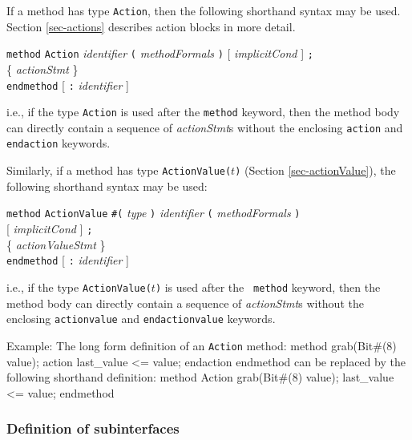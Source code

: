 \documentclass[twoside,letterpaper]{article}
\newcommand{\hm}{\hspace*{1em}}
\newcommand{\hmm}{\hspace*{2em}}
\newcommand{\hmmmm}{\hspace*{4em}}
\newenvironment{libverbatim}
  {\vspace*{-1.0em}
   \verbatim}
  {\endverbatim
  }
\newcommand{\te}[1]{\texttt{#1}}
\newcommand{\nterm}[1]{\emph{#1}}
\newcommand{\term}[1]{\texttt{#1}}
\newcommand{\many}[1]{\{ #1 \}}
\newcommand{\opt}[1]{[ #1 ]}
\newcommand{\gram}[2]{    \hm\makebox[10em][l]{\it #1}\makebox[1.5em][l]{::=}    #2}
\newcommand{\grammore}[1]{\hm\makebox[10em][l]{      }\makebox[1.5em][l]{}       #1}
\begin{document}
If a method has type \texttt{Action}, then the following shorthand syntax
may be used.  Section {\ref{sec-actions}}  describes action blocks in
more detail.

\gram{methodDef}{ \term{method} \term{Action} \nterm{identifier}
                      \term{(} \nterm{methodFormals} \term{)}
                      \opt{ \nterm{implicitCond} }
                      \term{;} } \\
\grammore{        \hmm \many{ \nterm{actionStmt} } } \\
\grammore{        \term{endmethod} \opt{ \term{:} \nterm{identifier} } }

i.e., if the type \texttt{Action} is used after the \texttt{method} keyword,
then the method body can directly contain a sequence of
\nterm{actionStmt}s
without the enclosing \te{action} and \te{endaction} keywords.

Similarly, if a method has type \texttt{ActionValue($t$)} (Section
\ref{sec-actionValue}),  the following
shorthand syntax may be used:

\gram{methodDef}{ \term{method} \term{ActionValue} \term{\#(} \nterm{type} \term{)} \nterm{identifier}
                      \term{(} \nterm{methodFormals} \term{)} } \\
\grammore       { \hmmmm   \opt{ \nterm{implicitCond} } \term{;} } \\
\grammore{        \hmm \many{ \nterm{actionValueStmt} } } \\
\grammore{        \term{endmethod} \opt{ \term{:} \nterm{identifier} } }

i.e., if the type \texttt{ActionValue($t$)} is used after the {\tt
method} keyword, then the method body can directly contain a sequence
of
\nterm{actionStmt}s
without the enclosing \te{actionvalue} and \te{endactionvalue} keywords.

Example:
The long form definition of an \te{Action} method:
\begin{libverbatim}
   method grab(Bit#(8) value);
      action
          last_value <= value;
      endaction
   endmethod
\end{libverbatim}
can be replaced by the following shorthand definition:
\begin{libverbatim}
   method Action grab(Bit#(8) value);
      last_value <= value;
   endmethod
\end{libverbatim}

\subsubsection{Definition of subinterfaces}
\end{document}
